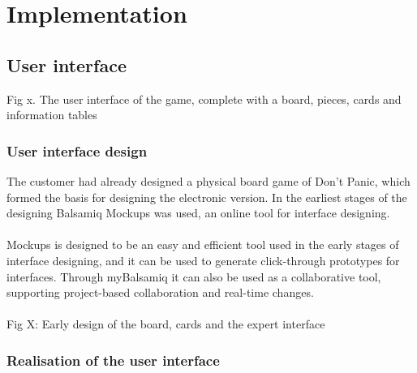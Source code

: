 \chapter{Implementation}

\section{User interface}
Fig x. The user interface of the game, complete with a board, pieces, cards and information tables







\subsection{User interface design}

The customer had already designed a physical board game of Don’t Panic, which formed the basis for designing the electronic version. In the earliest stages of the designing Balsamiq Mockups was used, an online tool for interface designing.\\
\\
Mockups is designed to be an easy and efficient tool used in the early stages of interface designing, and it can be used to generate click-through prototypes for interfaces. Through myBalsamiq it can also be used as a collaborative tool, supporting project-based collaboration and real-time changes.\\
\\ %
Fig X: Early design of the board, cards and the expert interface  

\subsection{Realisation of the user interface}

